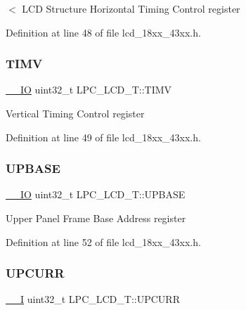$<$ L\+CD Structure Horizontal Timing Control register 

Definition at line 48 of file lcd\+\_\+18xx\+\_\+43xx.\+h.

\mbox{\label{struct_l_p_c___l_c_d___t_a01422d09a1ceb2784cdddd12c2b78cfc}} 
\subsubsection{\texorpdfstring{T\+I\+MV}{TIMV}}
{\footnotesize\ttfamily \hyperlink{core__sc300_8h_aec43007d9998a0a0e01faede4133d6be}{\+\_\+\+\_\+\+IO} uint32\+\_\+t L\+P\+C\+\_\+\+L\+C\+D\+\_\+\+T\+::\+T\+I\+MV}

Vertical Timing Control register 

Definition at line 49 of file lcd\+\_\+18xx\+\_\+43xx.\+h.

\mbox{\label{struct_l_p_c___l_c_d___t_a4df506e185ae165500576e5aeca11df3}} 
\subsubsection{\texorpdfstring{U\+P\+B\+A\+SE}{UPBASE}}
{\footnotesize\ttfamily \hyperlink{core__sc300_8h_aec43007d9998a0a0e01faede4133d6be}{\+\_\+\+\_\+\+IO} uint32\+\_\+t L\+P\+C\+\_\+\+L\+C\+D\+\_\+\+T\+::\+U\+P\+B\+A\+SE}

Upper Panel Frame Base Address register 

Definition at line 52 of file lcd\+\_\+18xx\+\_\+43xx.\+h.

\mbox{\label{struct_l_p_c___l_c_d___t_ab659a34422da80a7f95649194f332a09}} 
\subsubsection{\texorpdfstring{U\+P\+C\+U\+RR}{UPCURR}}
{\footnotesize\ttfamily \hyperlink{core__sc300_8h_af63697ed9952cc71e1225efe205f6cd3}{\+\_\+\+\_\+I} uint32\+\_\+t L\+P\+C\+\_\+\+L\+C\+D\+\_\+\+T\+::\+U\+P\+C\+U\+RR}

